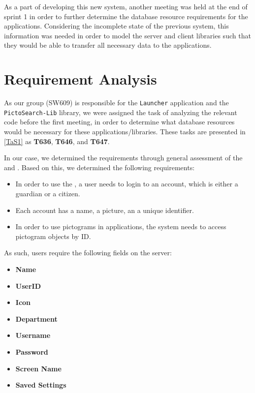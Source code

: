 As a part of developing this new system, another meeting was held at the end of
sprint 1 in order to further determine the database resource requirements for
the applications. Considering the incomplete state of the previous system, this information was needed in order to
model the server and client libraries such that they would be able to transfer all
necessary data to the applications.

\section{Requirement Analysis}
As our group (SW609) is responsible for the \texttt{Launcher} application and
the \\\texttt{PictoSearch-Lib} library, we were assigned the task of analyzing
the relevant code before the first meeting, in order to determine what
database resources would be necessary for these applications/libraries. These
tasks are presented in \autoref{TaS1} as \textbf{T636}, \textbf{T646}, and
\textbf{T647}.\nl

In our case, we determined the requirements through general assessment of the
 and . Based on
this, we determined the following requirements:\nl

\begin{itemize}
  \item In order to use the , a user needs to login to an
  account, which is either a guardian or a citizen.
  \item Each account has a name, a picture, an a unique identifier.
  \item In order to use pictograms in applications, the system needs to
  access pictogram objects by ID.
\end{itemize}

As such, users require the following fields on the
server: 
\begin{itemize}
  \item \textbf{Name}
  \item \textbf{UserID}
  \item \textbf{Icon}
  \item \textbf{Department}
  \item \textbf{Username}
  \item \textbf{Password}
  \item \textbf{Screen Name}
  \item \textbf{Saved Settings}
\end{itemize}

